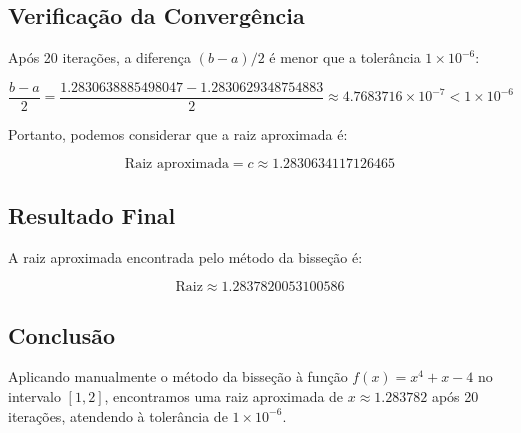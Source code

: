 \documentclass{article}
\begin{document}
\subsection*{Verificação da Convergência}

Após 20 iterações, a diferença \( (b - a)/2 \) é menor que a tolerância \( 1 \times 10^{-6} \):

\[
\frac{b - a}{2} = \frac{1.2830638885498047 - 1.2830629348754883}{2} \approx 4.7683716 \times 10^{-7} < 1 \times 10^{-6}
\]

Portanto, podemos considerar que a raiz aproximada é:

\[
\text{Raiz aproximada} = c \approx 1.2830634117126465
\]

\subsection*{Resultado Final}

A raiz aproximada encontrada pelo método da bisseção é:

\[
\text{Raiz} \approx 1.2837820053100586
\]

\subsection*{Conclusão}

Aplicando manualmente o método da bisseção à função \( f(x) = x^4 + x - 4 \) no intervalo \([1, 2]\), encontramos uma raiz aproximada de \( x \approx 1.283782 \) após 20 iterações, atendendo à tolerância de \( 1 \times 10^{-6} \).
\end{document}
